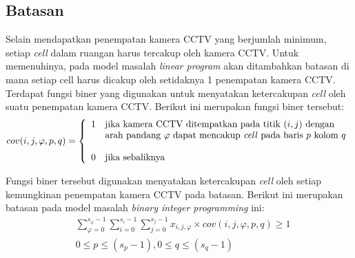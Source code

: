 \subsection{Batasan}
Selain mendapatkan penempatan kamera CCTV yang berjumlah minimum, setiap \textit{cell} dalam ruangan harus tercakup oleh kamera CCTV. Untuk memenuhinya, pada model masalah \textit{linear program} akan ditambahkan batasan di mana setiap cell harus dicakup oleh setidaknya 1 penempatan kamera CCTV. Terdapat fungsi biner yang digunakan untuk menyatakan ketercakupan \textit{cell} oleh suatu penempatan kamera CCTV. Berikut ini merupakan fungsi biner tersebut:
\begin{equation}
	cov(i,j,\varphi,p,q) =
	\left \{
		\begin{array}{ll}
			1 & \text{jika kamera CCTV ditempatkan pada titik } (i,j) \text{ dengan}\\
  			  & \text{arah pandang } \varphi \text{ dapat mencakup \textit{cell} pada baris } p\text{ kolom } q\\
  			  & \\
  			0 & \text{jika sebaliknya}
		\end{array}
	\right.
\end{equation}

Fungsi biner tersebut digunakan menyatakan ketercakupan \textit{cell} oleh setiap kemungkinan penempatan kamera CCTV pada batasan. Berikut ini merupakan batasan pada model masalah \textit{binary integer programming} ini:
\begin{equation}
	\begin{split}
		& \sum_{\varphi=0}^{s_{\varphi}-1} \sum_{i=0}^{s_i-1} \sum_{j=0}^{s_j-1} x_{i,j,\varphi} \times cov(i,j,\varphi,p,q) \geq 1\\
		& 0 \leq p \leq (s_p - 1), 0 \leq q \leq (s_q - 1)
	\end{split}
\end{equation}

